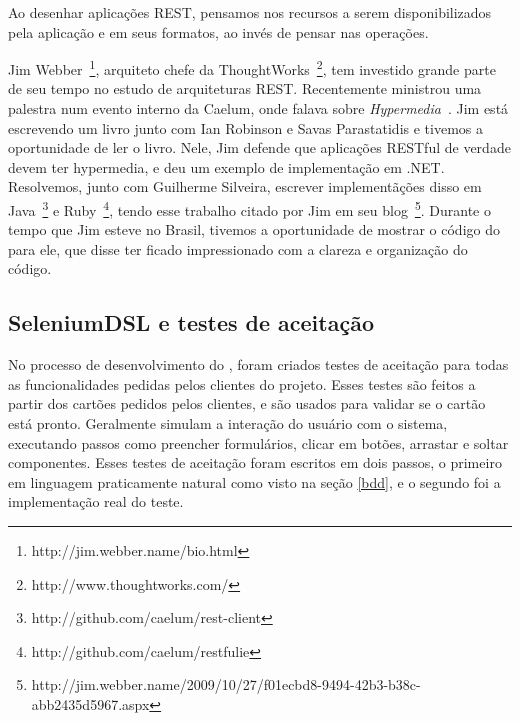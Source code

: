 Ao desenhar aplicações REST, pensamos nos recursos a serem disponibilizados pela aplicação e em seus formatos, ao invés de
pensar nas operações.

Jim Webber~\footnote{http://jim.webber.name/bio.html}, arquiteto chefe da ThoughtWorks~\footnote{http://www.thoughtworks.com/},
tem investido grande parte de seu tempo no estudo de arquiteturas REST. Recentemente ministrou uma palestra num evento interno
da Caelum, onde falava sobre \textit{Hypermedia}~\cite{rest-jim}.
Jim está escrevendo um livro junto com Ian Robinson e Savas Parastatidis e tivemos a oportunidade de ler o livro. Nele, Jim 
defende que aplicações RESTful de verdade devem ter hypermedia, e deu um exemplo de implementação em .NET. Resolvemos, junto com
Guilherme Silveira, escrever implementãções disso em Java~\footnote{http://github.com/caelum/rest-client} e 
Ruby~\footnote{http://github.com/caelum/restfulie}, tendo esse trabalho citado por Jim em seu 
blog~\footnote{http://jim.webber.name/2009/10/27/f01ecbd8-9494-42b3-b38c-abb2435d5967.aspx}.
Durante o tempo que Jim esteve no Brasil, tivemos a oportunidade de mostrar o código do \calopsita para ele, que disse ter
ficado impressionado com a clareza e organização do código.

\subsection{SeleniumDSL e testes de aceitação}
No processo de desenvolvimento do \calopsita, foram criados testes de aceitação para todas as
funcionalidades pedidas pelos clientes do projeto. Esses testes são feitos a partir dos cartões pedidos pelos clientes,
e são usados para validar se o cartão está pronto. Geralmente simulam a interação do usuário com o sistema, executando
passos como preencher formulários, clicar em botões, arrastar e soltar componentes. Esses testes de aceitação
foram escritos em dois passos, o primeiro em linguagem praticamente natural como visto na seção \ref{bdd}, e o segundo
foi a implementação real do teste.

